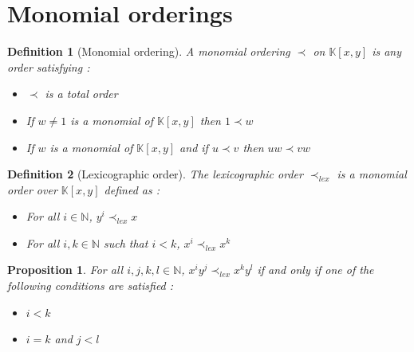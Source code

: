 \documentclass{article}
\newtheorem{definition}{Definition}[section]
\newtheorem{proposition}{Proposition}[section]
\begin{document}
\section{Monomial orderings}

\begin{definition}[Monomial ordering]\label{def:monomial-order}
    A monomial ordering $\prec$ on $\mathbb{K}[x, y]$ is any order satisfying : 
    \begin{itemize}
        \item $\prec$ is a total order
        \item If $w \neq 1$ is a monomial of $\mathbb{K}[x, y]$ then $1 \prec w$
        \item If $w$ is a monomial of $\mathbb{K}[x, y]$ and if $u \prec v$ then $uw \prec vw$
    \end{itemize}
\end{definition}

\begin{definition}[Lexicographic order]\label{def:lexicographic-order}
    The lexicographic order $\prec_{lex}$ is a monomial order over $\mathbb{K}[x, y]$ defined as :
    \begin{itemize}
        \item For all $i \in \mathbb{N}$, $y^{i} \prec_{lex} x$
        \item For all $i, k \in \mathbb{N}$ such that $i<k$,
        $x^{i} \prec_{lex} x^{k}$
    \end{itemize}
\end{definition}

\begin{proposition}
    For all $i, j, k, l \in \mathbb{N}$, $x^{i}y^{j} \prec_{lex} x^{k}y^{l}$ if and only if one of the following conditions are satisfied : 
    \begin{itemize}
        \item $i < k$
        \item $i = k$ and $j < l$
    \end{itemize}
\end{proposition}
\end{document}
